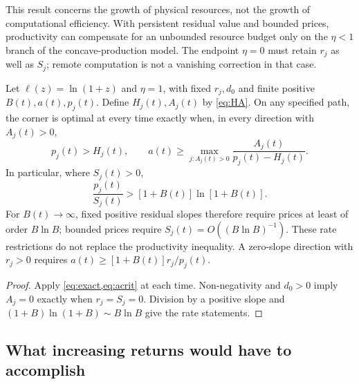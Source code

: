 This result concerns the growth of physical resources, not the growth
of computational efficiency. With persistent residual value and bounded
prices, productivity can compensate for an unbounded resource budget
only on the $\eta<1$ branch of the concave-production model. The endpoint
$\eta=0$ must retain $r_j$ as well as $S_j$; remote computation is not a
vanishing correction in that case.

\begin{corollary}
\label{prop:persistence}
Let $\ell(z)=\ln(1+z)$ and $\eta=1$, with fixed $r_j,d_0$ and finite
positive $B(t),a(t),p_j(t)$. Define $H_j(t),A_j(t)$ by
\cref{eq:HA}. On any specified path, the corner is optimal at every
time exactly when, in every direction with $A_j(t)>0$,
\begin{equation}
 p_j(t)>H_j(t),\qquad
 a(t)\geq\max_{j:A_j(t)>0}
       \frac{A_j(t)}{p_j(t)-H_j(t)}.
 \label{eq:pathwise}
\end{equation}
In particular, where $S_j(t)>0$,
\begin{equation}
 \frac{p_j(t)}{S_j(t)}>[1+B(t)]\ln[1+B(t)].
 \label{eq:path-ratio}
\end{equation}
For $B(t)\to\infty$, fixed positive residual slopes therefore require
prices at least of order $B\ln B$; bounded prices require
$S_j(t)=O((B\ln B)^{-1})$. These rate restrictions do not replace the
productivity inequality. A zero-slope direction with $r_j>0$ requires
$a(t)\geq[1+B(t)]r_j/p_j(t)$.
\end{corollary}
\begin{proof}
Apply \cref{eq:exact,eq:acrit} at each time. Non-negativity and $d_0>0$
imply $A_j=0$ exactly when $r_j=S_j=0$. Division by a positive slope
and $(1+B)\ln(1+B)\sim B\ln B$ give the rate statements.
\end{proof}


\subsection{What increasing returns would have to accomplish}

